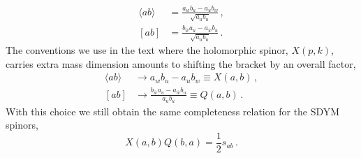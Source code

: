 \documentclass[11pt,letter]{article}
\begin{document}
\begin{align}
\langle ab \rangle &= \frac{a_w b_u-a_u b_w}{\sqrt{a_ub_u}}\,,
\\
[ab] &= \frac{b_{\bar{w}}a_u-a_{\bar{w}}b_u}{\sqrt{a_ub_u}}\,.
\end{align}
The conventions we use in the text where the holomorphic spinor,
$X(p,k)$, carries extra mass dimension amounts to shifting
the bracket by an overall factor,
\begin{align}
\langle ab \rangle &\rightarrow a_w b_u-a_u b_w \equiv X(a,b)\,,
\\
[ab] &\rightarrow \frac{b_{\bar{w}}a_u-a_{\bar{w}}b_u}{a_ub_u}\equiv Q(a,b)\, .
\end{align}
With this choice we still obtain the same completeness relation for the SDYM spinors,
\begin{equation}
X(a,b)Q(b,a) = \frac{1}{2}s_{ab}\, .
\end{equation}
\end{document}
